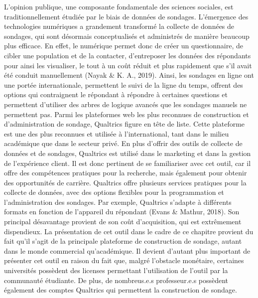\documentclass[
  letterpaper,
  DIV=11,
  numbers=noendperiod]{scrreprt}
\begin{document}
L'opinion publique, une composante fondamentale des sciences sociales,
est traditionnellement étudiée par le biais de données de sondages.
L'émergence des technologies numériques a grandement transformé la
collecte de données de sondages, qui sont désormais conceptualisés et
administrés de manière beaucoup plus efficace. En effet, le numérique
permet donc de créer un questionnaire, de cibler une population et de la
contacter, d'entreposer les données des répondants pour ainsi les
visualiser, le tout à un coût réduit et plus rapidement que s'il avait
été conduit manuellement (Nayak \& K. A., 2019). Ainsi, les sondages en
ligne ont une portée internationale, permettent le suivi de la ligne du
temps, offrent des options qui contraignent le répondant à répondre à
certaines questions et permettent d'utiliser des arbres de logique
avancés que les sondages manuels ne permettent pas. Parmi les
plateformes web les plus reconnues de construction et d'administration
de sondage, Qualtrics figure en tête de liste. Cette plateforme est une
des plus reconnues et utilisée à l'international, tant dans le milieu
académique que dans le secteur privé. En plus d'offrir des outils de
collecte de données et de sondages, Qualtrics est utilisé dans le
marketing et dans la gestion de l'expérience client. Il est donc
pertinent de se familiariser avec cet outil, car il offre des
compétences pratiques pour la recherche, mais également pour obtenir des
opportunités de carrière. Qualtrics offre plusieurs services pratiques
pour la collecte de données, avec des options flexibles pour la
programmation et l'administration des sondages. Par exemple, Qualtrics
s'adapte à différents formats en fonction de l'appareil du répondant
(Evans \& Mathur, 2018). Son principal désavantage provient de son coût
d'acquisition, qui est extrêmement dispendieux. La présentation de cet
outil dans le cadre de ce chapitre provient du fait qu'il s'agit de la
principale plateforme de construction de sondage, autant dans le monde
commercial qu'académique. Il devient d'autant plus important de
présenter cet outil en raison du fait que, malgré l'obstacle monétaire,
certaines universités possèdent des licenses permettant l'utilisation de
l'outil par la communauté étudiante. De plus, de nombreus.e.s
professeur.e.s possèdent également des comptes Qualtrics qui permettent
la construction de sondage.
\end{document}
